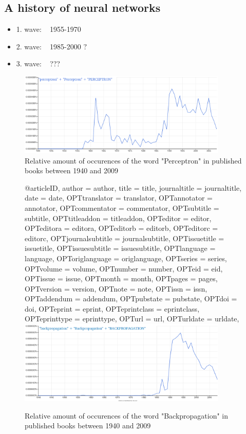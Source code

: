 \begin{appendices}

\chapter{A history of neural networks}

\begin{itemize}
	\item 1. wave: ~ 1955-1970
	\item 2. wave: ~ 1985-2000 \(?\)
	\item 3. wave: ~ ??? 
\end{itemize}

\begin{figure}
	\centering
	\includegraphics[height=150px]{gfx/NGrams_Perceptron.png}
	\caption{Relative amount of occurences of the word "Perceptron" in published books between 1940 and 2009}
\end{figure}

\begin{figure}
@article{ID,
	author = {author},
	title = {title},
	journaltitle = {journaltitle},
	date = {date},
	OPTtranslator = {translator},
	OPTannotator = {annotator},
	OPTcommentator = {commentator},
	OPTsubtitle = {subtitle},
	OPTtitleaddon = {titleaddon},
	OPTeditor = {editor},
	OPTeditora = {editora},
	OPTeditorb = {editorb},
	OPTeditorc = {editorc},
	OPTjournalsubtitle = {journalsubtitle},
	OPTissuetitle = {issuetitle},
	OPTissuesubtitle = {issuesubtitle},
	OPTlanguage = {language},
	OPToriglanguage = {origlanguage},
	OPTseries = {series},
	OPTvolume = {volume},
	OPTnumber = {number},
	OPTeid = {eid},
	OPTissue = {issue},
	OPTmonth = {month},
	OPTpages = {pages},
	OPTversion = {version},
	OPTnote = {note},
	OPTissn = {issn},
	OPTaddendum = {addendum},
	OPTpubstate = {pubstate},
	OPTdoi = {doi},
	OPTeprint = {eprint},
	OPTeprintclass = {eprintclass},
	OPTeprinttype = {eprinttype},
	OPTurl = {url},
	OPTurldate = {urldate},
}
	\centering
	\includegraphics[height=150px]{gfx/NGrams_Backpropagation.png}
	\caption{Relative amount of occurences of the word "Backpropagation" in published books between 1940 and 2009}
	\label{fig:NGBackprop}
\end{figure}

\end{appendices}